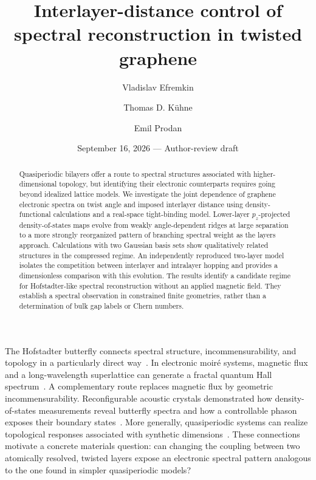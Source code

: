 \documentclass[aps,prl,reprint,superscriptaddress,longbibliography]{revtex4-2}
\begin{document}
\title{Interlayer-distance control of spectral reconstruction in twisted graphene}
\author{Vladislav Efremkin}
\author{Thomas D. K\"uhne}
\author{Emil Prodan}
\date{September 16, 2026 --- Author-review draft}
\begin{abstract}
Quasiperiodic bilayers offer a route to spectral structures associated with higher-dimensional topology, but identifying their electronic counterparts requires going beyond idealized lattice models. We investigate the joint dependence of graphene electronic spectra on twist angle and imposed interlayer distance using density-functional calculations and a real-space tight-binding model. Lower-layer $p_z$-projected density-of-states maps evolve from weakly angle-dependent ridges at large separation to a more strongly reorganized pattern of branching spectral weight as the layers approach. Calculations with two Gaussian basis sets show qualitatively related structures in the compressed regime. An independently reproduced two-layer model isolates the competition between interlayer and intralayer hopping and provides a dimensionless comparison with this evolution. The results identify a candidate regime for Hofstadter-like spectral reconstruction without an applied magnetic field. They establish a spectral observation in constrained finite geometries, rather than a determination of bulk gap labels or Chern numbers.
\end{abstract}
\maketitle

The Hofstadter butterfly connects spectral structure, incommensurability, and topology in a particularly direct way~\cite{hofstadter1976}. In electronic moir\'e systems, magnetic flux and a long-wavelength superlattice can generate a fractal quantum Hall spectrum~\cite{dean2013}. A complementary route replaces magnetic flux by geometric incommensurability. Reconfigurable acoustic crystals demonstrated how density-of-states measurements reveal butterfly spectra and how a controllable phason exposes their boundary states~\cite{ni2019}. More generally, quasiperiodic systems can realize topological responses associated with synthetic dimensions~\cite{kraus2012,prodan2015}. These connections motivate a concrete materials question: can changing the coupling between two atomically resolved, twisted layers expose an electronic spectral pattern analogous to the one found in simpler quasiperiodic models?
\end{document}
